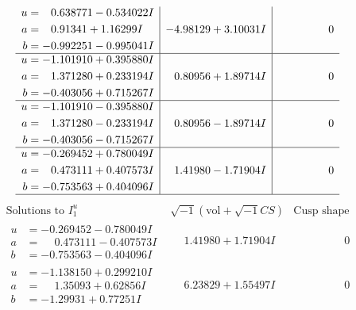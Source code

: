 \documentclass[1p]{elsarticle_modified}
\theoremstyle{definition}
\newcommand{\I}{\sqrt{-1}}
\begin{document}
$$\begin{array}{c|c|c}
\begin{aligned}
u &= \phantom{-}0.638771 - 0.534022 I \\
a &= \phantom{-}0.91341 + 1.16299 I \\
b &= -0.992251 - 0.995041 I\end{aligned}
 & -4.98129 + 3.10031 I & \phantom{-0.000000 } 0 \\ \hline\begin{aligned}
u &= -1.101910 + 0.395880 I \\
a &= \phantom{-}1.371280 + 0.233194 I \\
b &= -0.403056 + 0.715267 I\end{aligned}
 & \phantom{-}0.80956 + 1.89714 I & \phantom{-0.000000 } 0 \\ \hline\begin{aligned}
u &= -1.101910 - 0.395880 I \\
a &= \phantom{-}1.371280 - 0.233194 I \\
b &= -0.403056 - 0.715267 I\end{aligned}
 & \phantom{-}0.80956 - 1.89714 I & \phantom{-0.000000 } 0 \\ \hline\begin{aligned}
u &= -0.269452 + 0.780049 I \\
a &= \phantom{-}0.473111 + 0.407573 I \\
b &= -0.753563 + 0.404096 I\end{aligned}
 & \phantom{-}1.41980 - 1.71904 I & \phantom{-0.000000 } 0\\
 \hline 
 \end{array}$$\newpage$$\begin{array}{c|c|c}  
\text{Solutions to }I^u_{1}& \I (\text{vol} + \sqrt{-1}CS) & \text{Cusp shape}\\
 \hline 
\begin{aligned}
u &= -0.269452 - 0.780049 I \\
a &= \phantom{-}0.473111 - 0.407573 I \\
b &= -0.753563 - 0.404096 I\end{aligned}
 & \phantom{-}1.41980 + 1.71904 I & \phantom{-0.000000 } 0 \\ \hline\begin{aligned}
u &= -1.138150 + 0.299210 I \\
a &= \phantom{-}1.35093 + 0.62856 I \\
b &= -1.29931 + 0.77251 I\end{aligned}
 & \phantom{-}6.23829 + 1.55497 I & \phantom{-0.000000 } 0 \\ \hline\begin{aligned}

\end{aligned}
\end{array}$$
\end{document}
